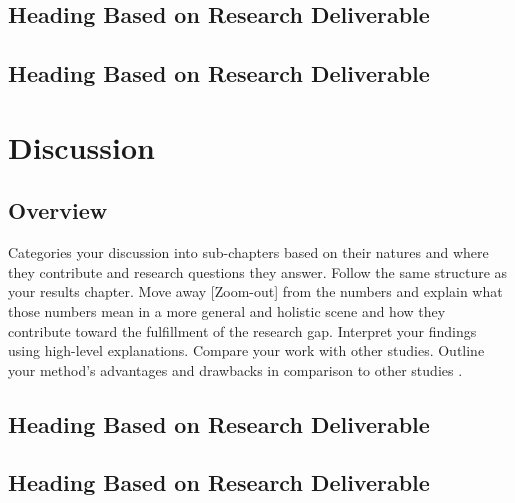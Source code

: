 \documentclass[12pt, twoside]{report}
\begin{document}
\section{Heading Based on Research Deliverable}


\section{Heading Based on Research Deliverable}


\chapter{Discussion} 
\thispagestyle{empty} 
\section{Overview}
Categories your discussion into sub-chapters based on their natures and where they contribute and research questions they answer. Follow the same structure as your results chapter. Move away [Zoom-out] from the numbers and explain what those numbers mean in a more general and holistic scene and how they contribute toward the fulfillment of the research gap. Interpret your findings using high-level explanations. Compare your work with other studies. Outline your method's advantages and drawbacks in comparison to other studies \citep{sullivan1997video}. 
\section{Heading Based on Research Deliverable}


\section{Heading Based on Research Deliverable}


\end{document}
